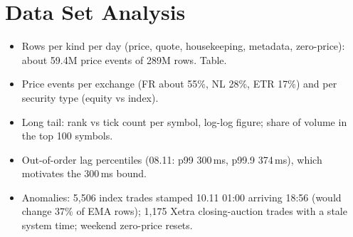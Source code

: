 \section{Data Set Analysis}
\label{sec:dataset}

\begin{itemize}
  \item Rows per kind per day (price, quote, housekeeping, metadata, zero-price): about 59.4M price events of 289M rows. Table.
  \item Price events per exchange (FR about 55\%, NL 28\%, ETR 17\%) and per security type (equity vs index).
  \item Long tail: rank vs tick count per symbol, log-log figure; share of volume in the top 100 symbols.
  \item Out-of-order lag percentiles (08.11: p99 300\,ms, p99.9 374\,ms), which motivates the 300\,ms bound.
  \item Anomalies: 5,506 index trades stamped 10.11 01:00 arriving 18:56 (would change 37\% of EMA rows); 1,175 Xetra closing-auction trades with a stale system time; weekend zero-price resets.
\end{itemize}

